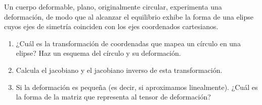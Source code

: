 \documentclass[../main.tex]{subfiles}
\begin{document}
\begin{problema}
	Un cuerpo deformable, plano, originalmente circular, experimenta
	una deformación, de modo que al alcanzar el equilibrio exhibe la
	forma de una elipse cuyos ejes de simetría coinciden con los ejes
	coordenados cartesianos.

	\begin{enumerate}
		\item ¿Cuál es la transformación de coordenadas que mapea un
		      círculo en una elipse? Haz un esquema del círculo y su
		      deformación.
		\item Calcula el jacobiano y el jacobiano inverso de esta
		      transformación.
		\item Si la deformación es pequeña (es decir, si aproximamos linealmente).
		      ¿Cuál es la forma de la matriz que representa al tensor de deformación?
	\end{enumerate}
\end{problema}
\end{document}
